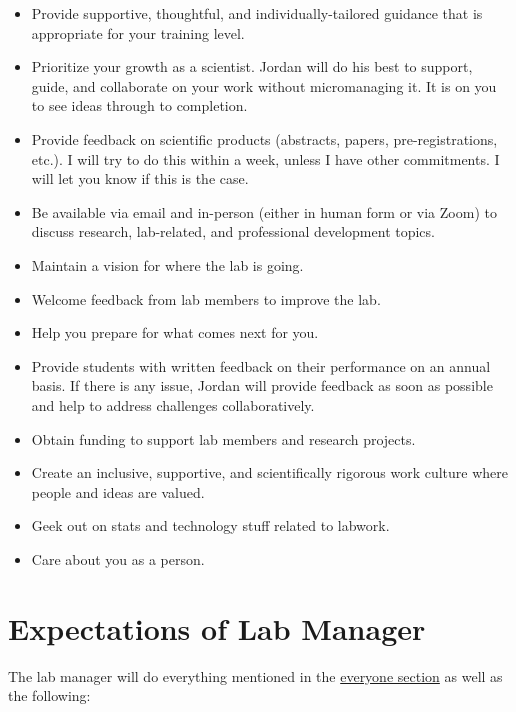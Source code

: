 \documentclass[
]{book}
\begin{document}
\begin{itemize}
\item
  Provide supportive, thoughtful, and individually-tailored guidance that is appropriate for your training level.
\item
  Prioritize your growth as a scientist. Jordan will do his best to support, guide, and collaborate on your work without micromanaging it. It is on you to see ideas through to completion.
\item
  Provide feedback on scientific products (abstracts, papers, pre-registrations, etc.). I will try to do this within a week, unless I have other commitments. I will let you know if this is the case.
\item
  Be available via email and in-person (either in human form or via Zoom) to discuss research, lab-related, and professional development topics.
\item
  Maintain a vision for where the lab is going.
\item
  Welcome feedback from lab members to improve the lab.
\item
  Help you prepare for what comes next for you.
\item
  Provide students with written feedback on their performance on an annual basis. If there is any issue, Jordan will provide feedback as soon as possible and help to address challenges collaboratively.
\item
  Obtain funding to support lab members and research projects.
\item
  Create an inclusive, supportive, and scientifically rigorous work culture where people and ideas are valued.
\item
  Geek out on stats and technology stuff related to labwork.
\item
  Care about you as a person.
\end{itemize}

\hypertarget{expectations-of-lab-manager}{%
\section{Expectations of Lab Manager}\label{expectations-of-lab-manager}}

The lab manager will do everything mentioned in the \protect\hyperlink{everyone}{everyone section} as well as the following:
\end{document}
